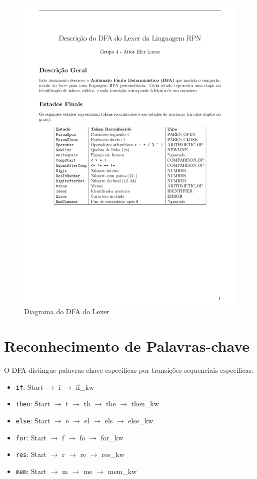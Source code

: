 \documentclass[a4paper,12pt]{article}
\begin{document}
\begin{figure}[H]
    \centering
    \includegraphics[width=\textwidth,height=\textheight,keepaspectratio]{dfa.pdf}
    \caption{Diagrama do DFA do Lexer}
    \label{fig:dfa}
\end{figure}

\section*{Reconhecimento de Palavras-chave}

O DFA distingue palavras-chave específicas por transições sequenciais específicas:

\begin{itemize}
    \item \texttt{if}: Start $\rightarrow$ i $\rightarrow$ if\_kw
    \item \texttt{then}: Start $\rightarrow$ t $\rightarrow$ th $\rightarrow$ the $\rightarrow$ then\_kw
    \item \texttt{else}: Start $\rightarrow$ e $\rightarrow$ el $\rightarrow$ els $\rightarrow$ else\_kw
    \item \texttt{for}: Start $\rightarrow$ f $\rightarrow$ fo $\rightarrow$ for\_kw
    \item \texttt{res}: Start $\rightarrow$ r $\rightarrow$ re $\rightarrow$ res\_kw
    \item \texttt{mem}: Start $\rightarrow$ m $\rightarrow$ me $\rightarrow$ mem\_kw
\end{itemize}
\end{document}
